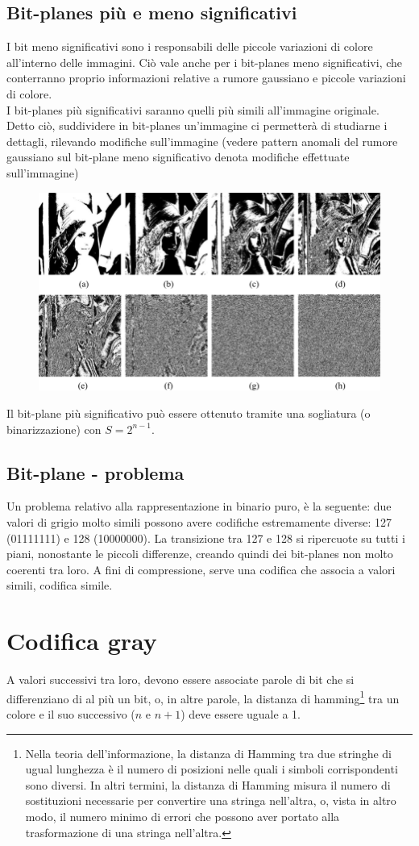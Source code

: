 \documentclass{report}
\begin{document}
	\subsection{Bit-planes più e meno significativi}
	I bit meno significativi sono i responsabili delle piccole variazioni di colore all'interno delle immagini. Ciò vale anche per i bit-planes meno significativi, che conterranno proprio informazioni relative a rumore gaussiano e piccole variazioni di colore.\\
	I bit-planes più significativi saranno quelli più simili all'immagine originale.\\
	Detto ciò, suddividere in bit-planes un'immagine ci permetterà di studiarne i dettagli, rilevando modifiche sull'immagine (vedere pattern anomali del rumore gaussiano sul bit-plane meno significativo denota modifiche effettuate sull'immagine)
	\begin{figure}[htp]
		\centering
		\includegraphics[width=0.7\linewidth]{bitplanes.png}
	\end{figure}
	Il bit-plane più significativo può essere ottenuto tramite una sogliatura (o binarizzazione) con $S=2^{n-1}$.
	
	\subsection{Bit-plane - problema}
	Un problema relativo alla rappresentazione in binario puro, è la seguente:
	due valori di grigio molto simili possono avere codifiche estremamente diverse: 127 (01111111) e 128 (10000000). La transizione tra 127 e 128 si ripercuote su tutti i piani, nonostante le piccoli differenze, creando quindi dei bit-planes non molto coerenti tra loro. A fini di compressione, serve una codifica che associa a valori simili, codifica simile.
	\section{Codifica gray}
	A valori successivi tra loro, devono essere associate parole di bit che si differenziano di al più un bit, o, in altre parole, la distanza di hamming\footnote{Nella teoria dell'informazione, la distanza di Hamming tra due stringhe di ugual lunghezza è il numero di posizioni nelle quali i simboli corrispondenti sono diversi. In altri termini, la distanza di Hamming misura il numero di sostituzioni necessarie per convertire una stringa nell'altra, o, vista in altro modo, il numero minimo di errori che possono aver portato alla trasformazione di una stringa nell'altra.} tra un colore e il suo successivo ($n$ e $n+1$) deve essere uguale a 1.
	
\end{document}
